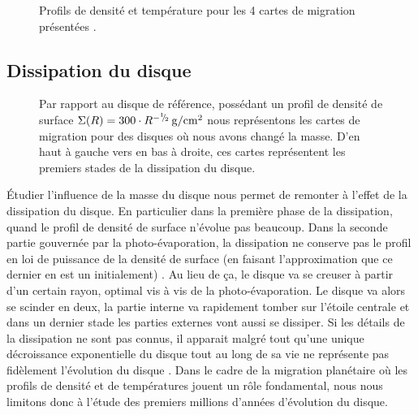 \begin{figure}[htbp]
\centering
{}\hfill
{}

\caption{Profils de densité et température pour les 4 cartes de migration présentées
\protect{}.}\label{fig:index_profiles}
\end{figure}

\subsection{Dissipation du disque}\label{sec:sigma_0}

\begin{figure}[htbp]
\centering
{}\hfill
{}

\hfill
{}

\caption[Effet de la dissipation sur la carte de migration.]{Par rapport au disque de référence, possédant un profil de densité
de surface $\Sigma(R) = 300 \cdot
R^{-{{}^{1\!\!}/ _{\!2}}}\mathrm{\thinspace g/cm^2}$ nous représentons les cartes de migration pour des disques où nous avons changé la masse. D'en haut à gauche vers en bas à droite, ces cartes représentent les premiers stades de la dissipation du disque. }\label{fig:map_total_mass}
\end{figure}

Étudier l'influence de la masse du disque nous permet de remonter à l'effet de la dissipation du disque. En particulier dans la
première phase de la dissipation, quand le profil de densité de surface n'évolue pas beaucoup. Dans la seconde partie gouvernée
par la photo-évaporation, la dissipation ne conserve pas le profil en loi de puissance de la densité de surface (en faisant
l'approximation que ce dernier en est un initialement) . Au lieu de ça, le
disque va se creuser à partir d'un certain rayon, optimal vis à vis de la photo-évaporation. Le disque va alors se scinder en
deux, la partie interne va rapidement tomber sur l'étoile centrale et dans un dernier stade les parties externes vont aussi se
dissiper. Si les détails de la dissipation ne sont pas connus, il apparait malgré tout qu'une unique décroissance exponentielle
du disque tout au long de sa vie ne représente pas fidèlement l'évolution du disque \citep{alexander2006photoevaporation}. Dans
le cadre de la migration planétaire où les profils de densité et de températures jouent un rôle fondamental, nous nous limitons
donc à l'étude des premiers millions d'années d'évolution du disque. 

